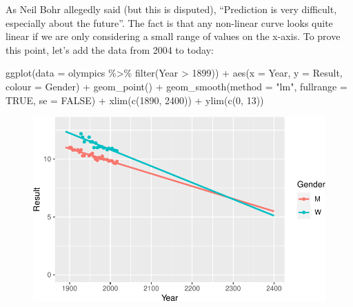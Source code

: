 \documentclass[
  letterpaper,
  DIV=11,
  numbers=noendperiod]{scrreprt}
\newenvironment{Shaded}{\begin{snugshade}}{\end{snugshade}}
\newcommand{\AttributeTok}[1]{\textcolor[rgb]{0.40,0.45,0.13}{#1}}
\newcommand{\ConstantTok}[1]{\textcolor[rgb]{0.56,0.35,0.01}{#1}}
\newcommand{\DecValTok}[1]{\textcolor[rgb]{0.68,0.00,0.00}{#1}}
\newcommand{\FunctionTok}[1]{\textcolor[rgb]{0.28,0.35,0.67}{#1}}
\newcommand{\NormalTok}[1]{\textcolor[rgb]{0.00,0.23,0.31}{#1}}
\newcommand{\SpecialCharTok}[1]{\textcolor[rgb]{0.37,0.37,0.37}{#1}}
\newcommand{\StringTok}[1]{\textcolor[rgb]{0.13,0.47,0.30}{#1}}
\begin{document}
As Neil Bohr allegedly said (but this is disputed), ``Prediction is very
difficult, especially about the future''. The fact is that any
non-linear curve looks quite linear if we are only considering a small
range of values on the x-axis. To prove this point, let's add the data
from 2004 to today:

\begin{Shaded}
\begin{Highlighting}[]
\FunctionTok{ggplot}\NormalTok{(}\AttributeTok{data =}\NormalTok{ olympics }\SpecialCharTok{\%\textgreater{}\%} \FunctionTok{filter}\NormalTok{(Year }\SpecialCharTok{\textgreater{}} \DecValTok{1899}\NormalTok{)) }\SpecialCharTok{+} 
  \FunctionTok{aes}\NormalTok{(}\AttributeTok{x =}\NormalTok{ Year, }\AttributeTok{y =}\NormalTok{ Result, }\AttributeTok{colour =}\NormalTok{ Gender) }\SpecialCharTok{+} 
  \FunctionTok{geom\_point}\NormalTok{() }\SpecialCharTok{+} \FunctionTok{geom\_smooth}\NormalTok{(}\AttributeTok{method =} \StringTok{"lm"}\NormalTok{, }\AttributeTok{fullrange =} \ConstantTok{TRUE}\NormalTok{, }\AttributeTok{se =} \ConstantTok{FALSE}\NormalTok{) }\SpecialCharTok{+}
  \FunctionTok{xlim}\NormalTok{(}\FunctionTok{c}\NormalTok{(}\DecValTok{1890}\NormalTok{, }\DecValTok{2400}\NormalTok{)) }\SpecialCharTok{+} \FunctionTok{ylim}\NormalTok{(}\FunctionTok{c}\NormalTok{(}\DecValTok{0}\NormalTok{, }\DecValTok{13}\NormalTok{))}
\end{Highlighting}
\end{Shaded}

\begin{figure}[H]

{\centering \includegraphics{./08-linearreg_files/figure-pdf/unnamed-chunk-21-1.pdf}

}

\end{figure}
\end{document}
